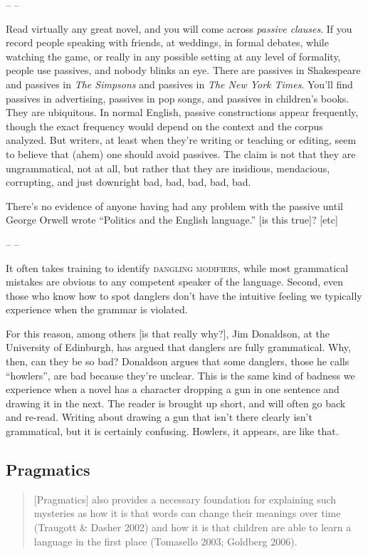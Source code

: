             \begin{center}
                -- --
            \end{center}
            
            Read virtually any great novel, and you will come across \textit{passive clauses}. If you record people speaking with friends, at weddings, in formal debates, while watching the game, or really in any possible setting at any level of formality, people use passives, and nobody blinks an eye. There are passives in Shakespeare and passives in \textit{The Simpsons} and passives in \textit{The New York Times}. You'll find passives in advertising, passives in pop songs, and passives in children's books. They are ubiquitous. In normal English, passive constructions appear frequently, though the exact frequency would depend on the context and the corpus analyzed. But writers, at least when they're writing or teaching or editing, seem to believe that 
             (ahem) one should avoid passives. The claim is not that they are ungrammatical, not at all, but rather that they are insidious, mendacious, corrupting, and just downright bad, bad, bad, bad, bad.

            There's no evidence of anyone having had any problem with the passive until George Orwell wrote ``Politics and the English language.'' [is this true]? [etc]

            \begin{center}
                -- --
            \end{center}
            
            It often takes training to identify \textsc{dangling modifiers}, while most grammatical mistakes are obvious to any competent speaker of the language. Second, even those who know how to spot danglers don't have the intuitive feeling we typically experience when the grammar is violated.
            
            For this reason, among others [is that really why?], Jim Donaldson, at the University of Edinburgh, has argued that danglers are fully grammatical. Why, then, can they be so bad? Donaldson argues that some danglers, those he calls ``howlers'', are bad because they're unclear. This is the same kind of badness we experience when a novel has a character dropping a gun in one sentence and drawing it in the next. The reader is brought up short, and will often go back and re-read. Writing about drawing a gun that isn't there clearly isn't grammatical, but it is certainly confusing. Howlers, it appears, are like that.



\subsection{Pragmatics} 
\begin{quote}
    [Pragmatics] also provides a necessary foundation for explaining such mysteries as how it is that words can change their meanings over time (Traugott \& Dasher 2002) and how it is that children are able to learn a language in the first place (Tomasello 2003; Goldberg 2006).\cite[17]{Israel2011}
\end{quote}
